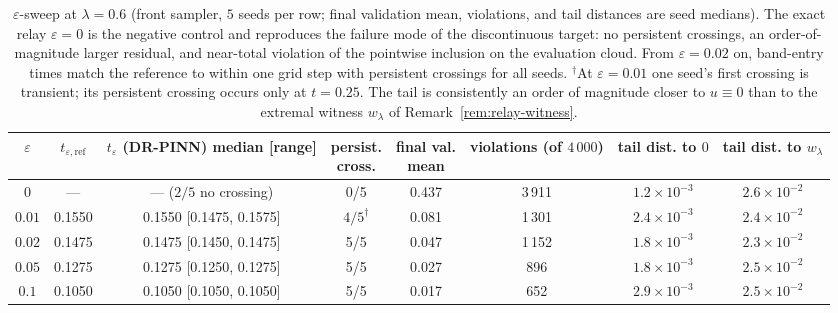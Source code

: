 \documentclass[11pt]{elsarticle}
\theoremstyle{definition}
\theoremstyle{remark}
\numberwithin{equation}{section}
\begin{document}
\begin{table}[htbp]
  \centering
  \small
  \setlength{\tabcolsep}{3pt}
  \begin{tabular}{cccccccc}
    \toprule
    $\varepsilon$ & $t_{\varepsilon,\mathrm{ref}}$ &
    \shortstack{$t_\varepsilon$ (DR-PINN)\\median [range]} &
    \shortstack{persist.\\cross.} &
    \shortstack{final val.\\mean} &
    \shortstack{violations\\(of $4\,000$)} &
    \shortstack{tail dist.\\to $0$} &
    \shortstack{tail dist.\\to $w_\lambda$} \\
    \midrule
    $0$    & ---    & --- ($2/5$ no crossing)   & 0/5 & 0.437 & 3\,911 & $1.2\times10^{-3}$ & $2.6\times10^{-2}$ \\
    $0.01$ & 0.1550 & 0.1550 [0.1475, 0.1575]   & $4/5^{\dagger}$ & 0.081 & 1\,301 & $2.4\times10^{-3}$ & $2.4\times10^{-2}$ \\
    $0.02$ & 0.1475 & 0.1475 [0.1450, 0.1475]   & 5/5 & 0.047 & 1\,152 & $1.8\times10^{-3}$ & $2.3\times10^{-2}$ \\
    $0.05$ & 0.1275 & 0.1275 [0.1250, 0.1275]   & 5/5 & 0.027 & 896    & $1.8\times10^{-3}$ & $2.5\times10^{-2}$ \\
    $0.1$  & 0.1050 & 0.1050 [0.1050, 0.1050]   & 5/5 & 0.017 & 652    & $2.9\times10^{-3}$ & $2.5\times10^{-2}$ \\
    \bottomrule
  \end{tabular}
  \caption{$\varepsilon$-sweep at $\lambda=0.6$ (front sampler, $5$ seeds
    per row; final validation mean, violations, and tail distances are
    seed medians). The exact relay $\varepsilon=0$ is the negative
    control and reproduces the failure mode of the discontinuous target:
    no persistent crossings, an order-of-magnitude larger residual, and
    near-total violation of the pointwise inclusion on the evaluation
    cloud. From $\varepsilon=0.02$ on, band-entry times match the
    reference to within one grid step with persistent crossings for all
    seeds. $^{\dagger}$At $\varepsilon=0.01$ one seed's first crossing is
    transient; its persistent crossing occurs only at $t=0.25$. The tail
    is consistently an order of magnitude closer to $u\equiv0$ than to
    the extremal witness $w_\lambda$ of
    Remark~\ref{rem:relay-witness}.}
  \label{tab:relay-eps}
\end{table}
\end{document}
